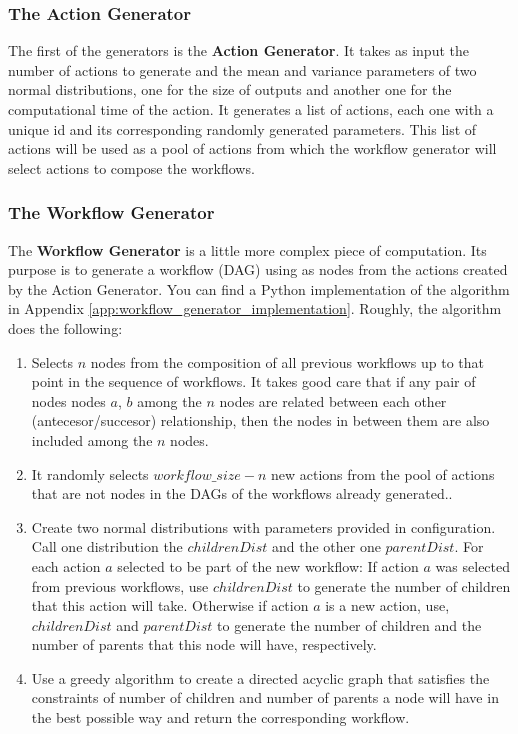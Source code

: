 \subsubsection{The Action Generator}
The first of the generators is the \textbf{Action Generator}.  It takes as input the number of actions to generate and the mean and variance parameters of two normal distributions, one for the size of outputs and another one for the computational time of the action.  It generates a list of actions, each one with a unique id and its corresponding randomly generated parameters. This list of actions will be used as a pool of actions from which the workflow generator will select actions to compose the workflows.

\subsubsection{The Workflow Generator}
The \textbf{Workflow Generator} is a little more complex piece of computation.  Its purpose is to generate a workflow (DAG) using as nodes from the actions created by the Action Generator.  You can find a Python implementation of the algorithm in Appendix \ref{app:workflow_generator_implementation}.  Roughly, the algorithm does the following:
\begin{enumerate}
\item Selects $n$ nodes from the composition of all previous workflows up to that point in the sequence of workflows. It takes good care that if any pair of nodes nodes $a$, $b$ among the $n$ nodes are related between each other (antecesor/succesor) relationship, then the nodes in between them are also included among the $n$ nodes.

\item It randomly selects $workflow\_size - n$ new actions from the pool of actions that are not nodes in the DAGs of the workflows already generated..

\item Create two normal distributions with parameters provided in configuration.  Call one distribution the $childrenDist$ and the other one $parentDist$. For each action $a$ selected to be part of the new workflow: If action $a$ was selected from previous workflows, use $childrenDist$ to generate the number of children that this action will take.  Otherwise if action $a$ is a new action, use, $childrenDist$ and $parentDist$ to generate the number of children and the number of parents that this node will have, respectively.

\item Use a greedy algorithm to create a directed acyclic graph that satisfies the constraints of number of children and number of parents a node will have in the best possible way and return the corresponding workflow.
\end{enumerate}


